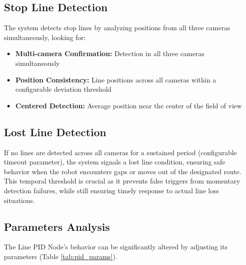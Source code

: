 \documentclass[9pt,technote]{IEEEtran}
\begin{document}
\subsection{Stop Line Detection}
The system detects stop lines by analyzing positions from all three cameras simultaneously, looking for:

\begin{itemize}
    \item \textbf{Multi-camera Confirmation:} Detection in all three cameras simultaneously
    \item \textbf{Position Consistency:} Line positions across all cameras within a configurable deviation threshold
    \item \textbf{Centered Detection:} Average position near the center of the field of view
\end{itemize}

\subsection{Lost Line Detection}
If no lines are detected across all cameras for a sustained period (configurable timeout parameter), the system signals a lost line condition, ensuring safe behavior when the robot encounters gaps or moves out of the designated route. This temporal threshold is crucial as it prevents false triggers from momentary detection failures, while still ensuring timely response to actual line loss situations.

\subsection{Parameters Analysis}
The Line PID Node's behavior can be significantly altered by adjusting its parameters (Table \ref{tab:pid_params}).
\end{document}
